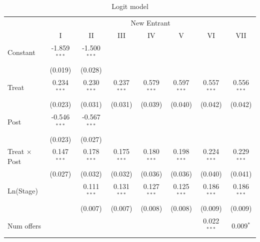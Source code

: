 \documentclass[
]{article}
\begin{document}
\par\endgroup
\begin{table}[htbp]
   \caption{Logit model}
   \centering
   \small
   \begin{tabular}{lccccccc}
      \toprule
       & \multicolumn{7}{c}{New Entrant}\\
                                          & I              & II             & III           & IV            & V             & VI            & VII\\  
      Constant                            & -1.859$^{***}$ & -1.500$^{***}$ &               &               &               &               &   \\   
                                          & (0.019)        & (0.028)        &               &               &               &               &   \\   
      Treat                               & 0.234$^{***}$  & 0.230$^{***}$  & 0.237$^{***}$ & 0.579$^{***}$ & 0.597$^{***}$ & 0.557$^{***}$ & 0.556$^{***}$\\   
                                          & (0.023)        & (0.031)        & (0.031)       & (0.039)       & (0.040)       & (0.042)       & (0.042)\\   
      Post                                & -0.546$^{***}$ & -0.567$^{***}$ &               &               &               &               &   \\   
                                          & (0.023)        & (0.027)        &               &               &               &               &   \\   
      Treat $\times$ Post                 & 0.147$^{***}$  & 0.178$^{***}$  & 0.175$^{***}$ & 0.180$^{***}$ & 0.198$^{***}$ & 0.224$^{***}$ & 0.229$^{***}$\\   
                                          & (0.027)        & (0.032)        & (0.032)       & (0.036)       & (0.036)       & (0.040)       & (0.041)\\   
      Ln(Stage)                           &                & 0.111$^{***}$  & 0.131$^{***}$ & 0.127$^{***}$ & 0.125$^{***}$ & 0.186$^{***}$ & 0.186$^{***}$\\   
                                          &                & (0.007)        & (0.007)       & (0.008)       & (0.008)       & (0.009)       & (0.009)\\   
      Num offers                          &                &                &               &               &               & 0.022$^{***}$ & 0.009$^{*}$\\   

\end{tabular}
\end{table}
\end{document}
